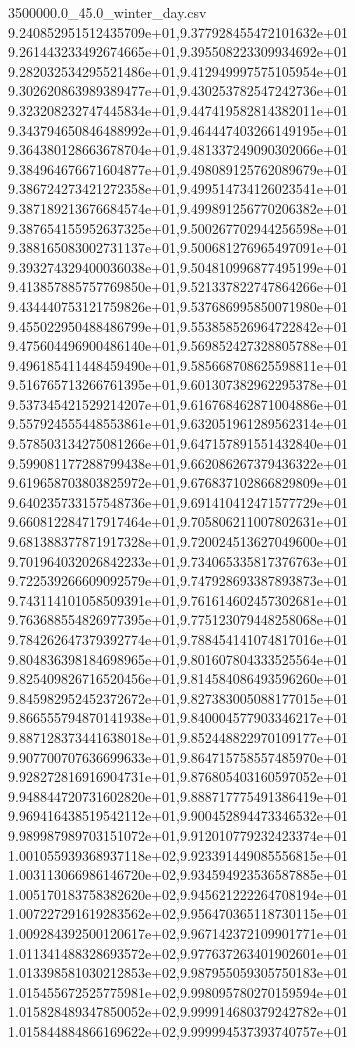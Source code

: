 \begin{filecontents*}{3500000.0_45.0_winter_day.csv}
9.240852951512435709e+01,9.377928455472101632e+01
9.261443233492674665e+01,9.395508223309934692e+01
9.282032534295521486e+01,9.412949997575105954e+01
9.302620863989389477e+01,9.430253782547242736e+01
9.323208232747445834e+01,9.447419582814382011e+01
9.343794650846488992e+01,9.464447403266149195e+01
9.364380128663678704e+01,9.481337249090302066e+01
9.384964676671604877e+01,9.498089125762089679e+01
9.386724273421272358e+01,9.499514734126023541e+01
9.387189213676684574e+01,9.499891256770206382e+01
9.387654155952637325e+01,9.500267702944256598e+01
9.388165083002731137e+01,9.500681276965497091e+01
9.393274329400036038e+01,9.504810996877495199e+01
9.413857885757769850e+01,9.521337822747864266e+01
9.434440753121759826e+01,9.537686995850071980e+01
9.455022950488486799e+01,9.553858526964722842e+01
9.475604496900486140e+01,9.569852427328805788e+01
9.496185411448459490e+01,9.585668708625598811e+01
9.516765713266761395e+01,9.601307382962295378e+01
9.537345421529214207e+01,9.616768462871004886e+01
9.557924555448553861e+01,9.632051961289562314e+01
9.578503134275081266e+01,9.647157891551432840e+01
9.599081177288799438e+01,9.662086267379436322e+01
9.619658703803825972e+01,9.676837102866829809e+01
9.640235733157548736e+01,9.691410412471577729e+01
9.660812284717917464e+01,9.705806211007802631e+01
9.681388377871917328e+01,9.720024513627049600e+01
9.701964032026842233e+01,9.734065335817376763e+01
9.722539266609092579e+01,9.747928693387893873e+01
9.743114101058509391e+01,9.761614602457302681e+01
9.763688554826977395e+01,9.775123079448258068e+01
9.784262647379392774e+01,9.788454141074817016e+01
9.804836398184698965e+01,9.801607804333525564e+01
9.825409826716520456e+01,9.814584086493596260e+01
9.845982952452372672e+01,9.827383005088177015e+01
9.866555794870141938e+01,9.840004577903346217e+01
9.887128373441638018e+01,9.852448822970109177e+01
9.907700707636699633e+01,9.864715758557485970e+01
9.928272816916904731e+01,9.876805403160597052e+01
9.948844720731602820e+01,9.888717775491386419e+01
9.969416438519542112e+01,9.900452894473346532e+01
9.989987989703151072e+01,9.912010779232423374e+01
1.001055939368937118e+02,9.923391449085556815e+01
1.003113066986146720e+02,9.934594923536587885e+01
1.005170183758382620e+02,9.945621222264708194e+01
1.007227291619283562e+02,9.956470365118730115e+01
1.009284392500120617e+02,9.967142372109901771e+01
1.011341488328693572e+02,9.977637263401902601e+01
1.013398581030212853e+02,9.987955059305750183e+01
1.015455672525775981e+02,9.998095780270159594e+01
1.015828489347850052e+02,9.999914680379242782e+01
1.015844884866169622e+02,9.999994537393740757e+01

\end{filecontents*}
